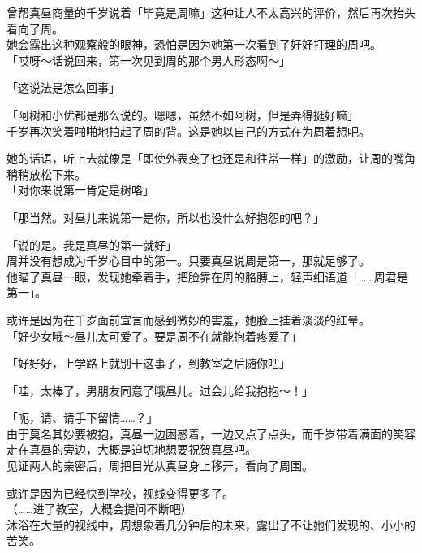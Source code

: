 曾帮真昼商量的千岁说着「毕竟是周嘛」这种让人不太高兴的评价，然后再次抬头看向了周。\\

她会露出这种观察般的眼神，恐怕是因为她第一次看到了好好打理的周吧。\\

「哎呀～话说回来，第一次见到周的那个男人形态啊～」

「这说法是怎么回事」

「阿树和小优都是那么说的。嗯嗯，虽然不如阿树，但是弄得挺好嘛」\\

千岁再次笑着啪啪地拍起了周的背。这是她以自己的方式在为周着想吧。

她的话语，听上去就像是「即使外表变了也还是和往常一样」的激励，让周的嘴角稍稍放松下来。\\

「对你来说第一肯定是树咯」

「那当然。对昼儿来说第一是你，所以也没什么好抱怨的吧？」

「说的是。我是真昼的第一就好」\\

周并没有想成为千岁心目中的第一。只要真昼说周是第一，那就足够了。\\

他瞄了真昼一眼，发现她牵着手，把脸靠在周的胳膊上，轻声细语道「……周君是第一」。

或许是因为在千岁面前宣言而感到微妙的害羞，她脸上挂着淡淡的红晕。\\

「好少女哦～昼儿太可爱了。要是周不在就能抱着疼爱了」

「好好好，上学路上就别干这事了，到教室之后随你吧」

「哇，太棒了，男朋友同意了哦昼儿。过会儿给我抱抱～！」

「呃，请、请手下留情……？」\\

由于莫名其妙要被抱，真昼一边困惑着，一边又点了点头，而千岁带着满面的笑容走在真昼的旁边，大概是迫切地想要祝贺真昼吧。\\

见证两人的亲密后，周把目光从真昼身上移开，看向了周围。

或许是因为已经快到学校，视线变得更多了。\\

（……进了教室，大概会提问不断吧）\\

沐浴在大量的视线中，周想象着几分钟后的未来，露出了不让她们发现的、小小的苦笑。

